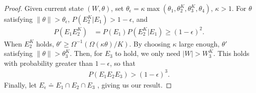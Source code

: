 \begin{proof}
Given current state $(W, \theta)$, set $\theta_\epsilon =
\kappa \max(\theta_1,\theta^K_2,\theta^K_3, \theta_4)$, $\kappa > 1$.
For $\theta$ satisfying $ \| \theta \| > \theta_\epsilon$, $P(E^K_2 | E_1)>1-\epsilon$, and
\begin{align*}
P(E_1E^K_2) %
& = P(E_1) P(E^K_2|E_1) \ge (1 - \epsilon)^2.
\end{align*}
When $E^K_2$ holds, $\theta' \ge \Omega^{-1}(\Omega(\kappa\theta)/K)$.
By choosing $\kappa$ large enough, $\theta'$ satisfying $ \| \theta \| > \theta^K_3$. Then, for
$E_3$ to hold, we only need $|W| > W^K_3$. This holds with probability
greater than $1-\epsilon$, so that
\begin{align*}
  P(E_1E_2E_3) > (1- \epsilon)^3.
\end{align*}
Finally, let $E_\epsilon \doteq E_1\cap E_2 \cap E_3$ , giving us our result.


\end{proof}


